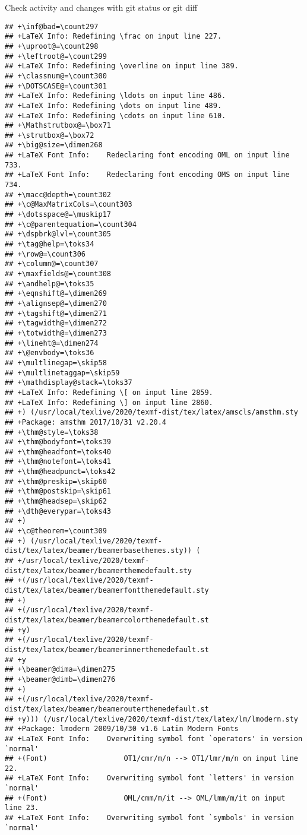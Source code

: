 \documentclass[ignorenonframetext,]{beamer}
\begin{document}
\begin{frame}[fragile]{Check activity and changes with git status or git
diff}
\begin{verbatim}
## +\inf@bad=\count297
## +LaTeX Info: Redefining \frac on input line 227.
## +\uproot@=\count298
## +\leftroot@=\count299
## +LaTeX Info: Redefining \overline on input line 389.
## +\classnum@=\count300
## +\DOTSCASE@=\count301
## +LaTeX Info: Redefining \ldots on input line 486.
## +LaTeX Info: Redefining \dots on input line 489.
## +LaTeX Info: Redefining \cdots on input line 610.
## +\Mathstrutbox@=\box71
## +\strutbox@=\box72
## +\big@size=\dimen268
## +LaTeX Font Info:    Redeclaring font encoding OML on input line 733.
## +LaTeX Font Info:    Redeclaring font encoding OMS on input line 734.
## +\macc@depth=\count302
## +\c@MaxMatrixCols=\count303
## +\dotsspace@=\muskip17
## +\c@parentequation=\count304
## +\dspbrk@lvl=\count305
## +\tag@help=\toks34
## +\row@=\count306
## +\column@=\count307
## +\maxfields@=\count308
## +\andhelp@=\toks35
## +\eqnshift@=\dimen269
## +\alignsep@=\dimen270
## +\tagshift@=\dimen271
## +\tagwidth@=\dimen272
## +\totwidth@=\dimen273
## +\lineht@=\dimen274
## +\@envbody=\toks36
## +\multlinegap=\skip58
## +\multlinetaggap=\skip59
## +\mathdisplay@stack=\toks37
## +LaTeX Info: Redefining \[ on input line 2859.
## +LaTeX Info: Redefining \] on input line 2860.
## +) (/usr/local/texlive/2020/texmf-dist/tex/latex/amscls/amsthm.sty
## +Package: amsthm 2017/10/31 v2.20.4
## +\thm@style=\toks38
## +\thm@bodyfont=\toks39
## +\thm@headfont=\toks40
## +\thm@notefont=\toks41
## +\thm@headpunct=\toks42
## +\thm@preskip=\skip60
## +\thm@postskip=\skip61
## +\thm@headsep=\skip62
## +\dth@everypar=\toks43
## +)
## +\c@theorem=\count309
## +) (/usr/local/texlive/2020/texmf-dist/tex/latex/beamer/beamerbasethemes.sty)) (
## +/usr/local/texlive/2020/texmf-dist/tex/latex/beamer/beamerthemedefault.sty
## +(/usr/local/texlive/2020/texmf-dist/tex/latex/beamer/beamerfontthemedefault.sty
## +)
## +(/usr/local/texlive/2020/texmf-dist/tex/latex/beamer/beamercolorthemedefault.st
## +y)
## +(/usr/local/texlive/2020/texmf-dist/tex/latex/beamer/beamerinnerthemedefault.st
## +y
## +\beamer@dima=\dimen275
## +\beamer@dimb=\dimen276
## +)
## +(/usr/local/texlive/2020/texmf-dist/tex/latex/beamer/beamerouterthemedefault.st
## +y))) (/usr/local/texlive/2020/texmf-dist/tex/latex/lm/lmodern.sty
## +Package: lmodern 2009/10/30 v1.6 Latin Modern Fonts
## +LaTeX Font Info:    Overwriting symbol font `operators' in version `normal'
## +(Font)                  OT1/cmr/m/n --> OT1/lmr/m/n on input line 22.
## +LaTeX Font Info:    Overwriting symbol font `letters' in version `normal'
## +(Font)                  OML/cmm/m/it --> OML/lmm/m/it on input line 23.
## +LaTeX Font Info:    Overwriting symbol font `symbols' in version `normal'

\end{verbatim}
\end{frame}
\end{document}
